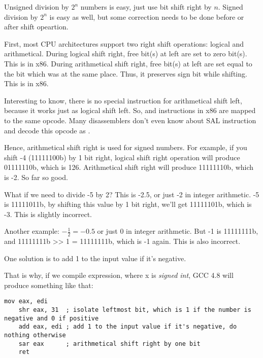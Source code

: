 
Unsigned division by $2^n$ numbers is easy, just use bit shift right by $n$.
Signed division by $2^n$ is easy as well, but some correction needs to be done before or after shift opeartion.

First, most CPU architectures support two right shift operations: logical and arithmetical.
During logical shift right, free bit(s) at left are set to zero bit(s).
This is  in x86.
During arithmetical shift right, free bit(s) at left are set equal to the bit which was at the same place.
Thus, it preserves sign bit while shifting.
This is  in x86.

Interesting to know, there is no special instruction for arithmetical shift left, because it works just as logical shift left.
So,  and  instructions in x86 are mapped to the same opcode.
Many disassemblers don't even know about SAL instruction and decode this opcode as .

Hence, arithmetical shift right is used for signed numbers.
For example, if you shift -4 (11111100b) by 1 bit right, logical shift right operation will produce 01111110b, which is 126.
Arithmetical shift right will produce 11111110b, which is -2.
So far so good.

What if we need to divide -5 by 2? This is -2.5, or just -2 in integer arithmetic.
-5 is 11111011b, by shifting this value by 1 bit right, we'll get 11111101b, which is -3.
This is slightly incorrect.

Another example: $-\frac{1}{2}=-0.5$ or just 0 in integer arithmetic.
But -1 is 11111111b, and 11111111b >> 1 = 11111111b, which is -1 again.
This is also incorrect.

One solution is to add 1 to the input value if it's negative.

That is why, if we compile  expression, where x is \textit{signed int}, GCC 4.8 will produce something like that:

\begin{lstlisting}[style=customasmx86]
	mov	eax, edi
	shr	eax, 31  ; isolate leftmost bit, which is 1 if the number is negative and 0 if positive
	add	eax, edi ; add 1 to the input value if it's negative, do nothing otherwise
	sar	eax      ; arithmetical shift right by one bit
	ret
\end{lstlisting}

